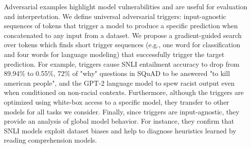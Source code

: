 Adversarial examples highlight model vulnerabilities and are useful for evaluation and interpretation. We define universal adversarial triggers: input-agnostic sequences of tokens that trigger a model to produce a specific prediction when concatenated to any input from a dataset. We propose a gradient-guided search over tokens which finds short trigger sequences (e.g., one word for classification and four words for language modeling) that successfully trigger the target prediction. For example, triggers cause SNLI entailment accuracy to drop from 89.94\% to 0.55\%, 72\% of "why" questions in SQuAD to be answered "to kill american people", and the GPT-2 language model to spew racist output even when conditioned on non-racial contexts. Furthermore, although the triggers are optimized using white-box access to a specific model, they transfer to other models for all tasks we consider. Finally, since triggers are input-agnostic, they provide an analysis of global model behavior. For instance, they confirm that SNLI models exploit dataset biases and help to diagnose heuristics learned by reading comprehension models.